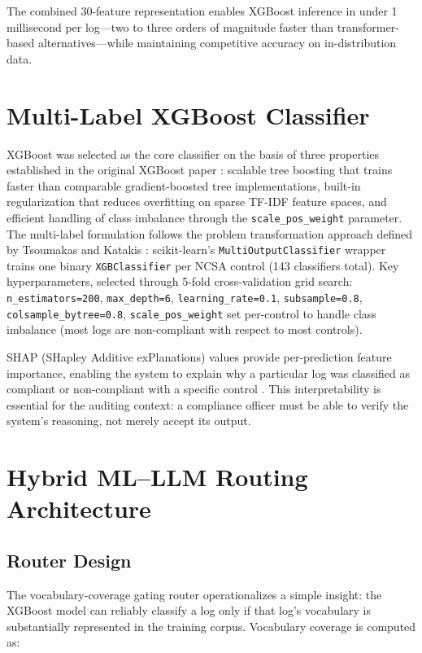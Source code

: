 \documentclass[12pt,oneside]{report}
\begin{document}
The combined 30-feature representation enables XGBoost inference in under 1 millisecond per log—two to three orders of magnitude faster than transformer-based alternatives—while maintaining competitive accuracy on in-distribution data.

\section{Multi-Label XGBoost Classifier}
\label{sec:xgboost}

XGBoost was selected as the core classifier on the basis of three properties established in the original XGBoost paper \cite{chen2016xgboost}: scalable tree boosting that trains faster than comparable gradient-boosted tree implementations, built-in regularization that reduces overfitting on sparse TF-IDF feature spaces, and efficient handling of class imbalance through the \texttt{scale\_pos\_weight} parameter. The multi-label formulation follows the problem transformation approach defined by Tsoumakas and Katakis \cite{tsoumakas2007}: scikit-learn's \texttt{MultiOutputClassifier} wrapper trains one binary \texttt{XGBClassifier} per NCSA control (143 classifiers total). Key hyperparameters, selected through 5-fold cross-validation grid search: \texttt{n\_estimators=200}, \texttt{max\_depth=6}, \texttt{learning\_rate=0.1}, \texttt{subsample=0.8}, \texttt{colsample\_bytree=0.8}, \texttt{scale\_pos\_weight} set per-control to handle class imbalance (most logs are non-compliant with respect to most controls).

SHAP (SHapley Additive exPlanations) values provide per-prediction feature importance, enabling the system to explain why a particular log was classified as compliant or non-compliant with a specific control \cite{chen2016xgboost}. This interpretability is essential for the auditing context: a compliance officer must be able to verify the system's reasoning, not merely accept its output.

\section{Hybrid ML--LLM Routing Architecture}
\label{sec:router}

\subsection{Router Design}

The vocabulary-coverage gating router operationalizes a simple insight: the XGBoost model can reliably classify a log only if that log's vocabulary is substantially represented in the training corpus. Vocabulary coverage is computed as:
\end{document}
